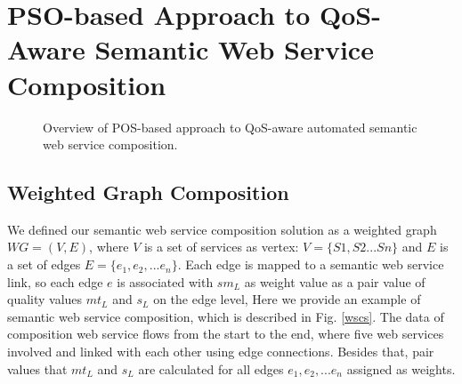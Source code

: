\documentclass{IEEEtran}
\begin{document}
\section{PSO-based Approach to QoS-Aware Semantic Web Service Composition}\label{qswsc_approach}

\begin{figure}[h]
\centering
{}
 \caption{Overview of POS-based approach to QoS-aware automated semantic web service composition.}
 \label{overview}
\end{figure}

\subsection{Weighted Graph Composition}

We defined our semantic web service composition solution as a weighted graph $WG = (V, E)$, where $V$ is a set of services as vertex: $V=\{S1, S2...Sn \}$ and $E$ is a set of edges $E = \{e_{1}, e_{2},... e_{n} \}$. Each edge is mapped to a semantic web service link, so each edge $e$ is associated with $sm_{L}$ as weight value as a pair value of quality values $mt_{L}$ and $s_{L}$ on the edge level, Here we provide an example of semantic web service composition, which is described in Fig. \ref{wscs}. The data of composition web service flows from the start to the end, where five web services involved and linked with each other using edge connections. Besides that, pair values that $mt_{L}$ and $s_{L}$ are calculated for all edges $e_{1}, e_{2},... e_{n}$ assigned as weights.
\end{document}
